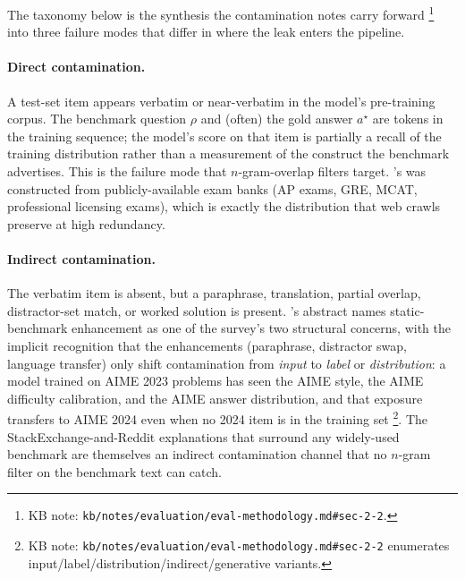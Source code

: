 The taxonomy below is the synthesis the contamination notes carry
forward%
\footnote{KB note: \nolinkurl{kb/notes/evaluation/eval-methodology.md#sec-2-2}.
}
into three failure modes that differ in where the leak enters the
pipeline.

\paragraph{Direct contamination.} A test-set item appears verbatim or
near-verbatim in the model's pre-training corpus. The benchmark
question $\rho$ and (often) the gold answer $a^\star$ are tokens in the
training sequence; the model's score on that item is partially a
recall of the training distribution rather than a measurement of the
construct the benchmark advertises. This is the failure mode that
$n$-gram-overlap  filters target. \citet{hendrycks2021-mmlu}'s
 was constructed from publicly-available exam banks (AP exams,
GRE, MCAT, professional licensing exams), which is exactly the
distribution that web crawls preserve at high redundancy.

\paragraph{Indirect contamination.} The verbatim item is absent, but a
paraphrase, translation, partial overlap, distractor-set match, or
worked solution is present. \citet{contamination-survey-2025}'s
abstract names static-benchmark enhancement as one of the survey's
two structural concerns, with the implicit recognition that the
enhancements (paraphrase, distractor swap, language transfer) only
shift contamination from \emph{input} to \emph{label} or
\emph{distribution}: a model trained on AIME 2023 problems has seen
the AIME style, the AIME difficulty calibration, and the AIME answer
distribution, and that exposure transfers to AIME 2024 even when no
2024 item is in the training set%
\footnote{KB note: \nolinkurl{kb/notes/evaluation/eval-methodology.md#sec-2-2} enumerates input/label/distribution/indirect/generative variants.}.
The StackExchange-and-Reddit explanations that surround any widely-used
benchmark are themselves an indirect contamination channel that no
$n$-gram filter on the benchmark text can catch.


